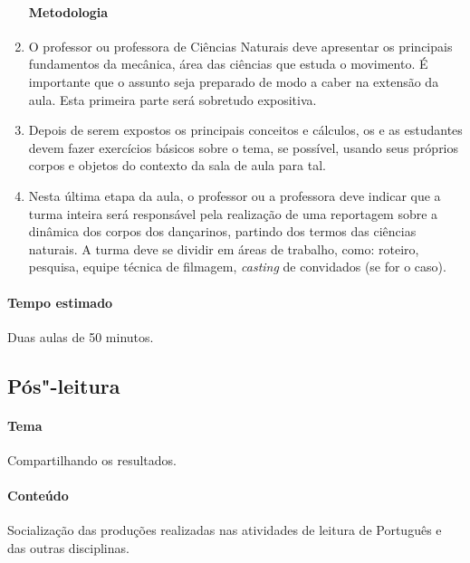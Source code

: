 \documentclass[12pt]{extarticle}
\begin{document}
\begin{enumerate}
\paragraph{Metodologia}

  \item
  O professor ou professora de Ciências Naturais deve apresentar os 
  principais fundamentos da mecânica, área das ciências que estuda
  o movimento. É importante que o assunto seja preparado de modo
  a caber na extensão da aula. Esta primeira parte será sobretudo expositiva.

  \item
  Depois de serem expostos os principais conceitos e cálculos,
  os e as estudantes devem fazer exercícios básicos sobre o tema, 
  se possível, usando seus próprios corpos e objetos do contexto
  da sala de aula para tal. 

  \item
  Nesta última etapa da aula, o professor ou a professora deve indicar que a turma inteira
  será responsável pela realização de uma reportagem sobre a dinâmica dos 
  corpos dos dançarinos, partindo dos termos das ciências naturais. A turma deve
  se dividir em áreas de trabalho, como: roteiro, pesquisa, equipe técnica de
  filmagem, \textit{casting} de convidados (se for o caso).
\end{enumerate}

\paragraph{Tempo estimado} Duas aulas de 50 minutos.



\subsection{Pós"-leitura}

\paragraph{Tema} Compartilhando os resultados.

\paragraph{Conteúdo} Socialização das produções realizadas nas atividades de leitura de Português e das outras disciplinas.
\end{document}
